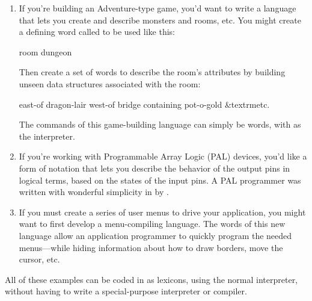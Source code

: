 \begin{enumerate}
\item If you're building an Adventure-type game, you'd want to write a
language that lets you create and describe monsters and rooms, etc. You
might create a defining word called  to be used like this:

\begin{Code}
room dungeon
\end{Code}
Then create a set of words to describe the room's attributes by building
unseen data structures associated with the room:

\begin{Code}[commandchars=\&\{\}]
east-of dragon-lair
west-of bridge
containing pot-o-gold
&textrm{etc.}
\end{Code}
The commands of this game-building language can simply be \Forth{}
words, with \Forth{} as the interpreter.

\item If you're working with Programmable Array Logic (PAL) devices,
you'd like a form of notation that lets you describe the behavior of
the output pins in logical terms, based on the states of the input
pins. A PAL programmer was written with wonderful simplicity in
\Forth{} by  \cite{stolowitz82}.

\item If you must create a series of user menus to drive your application,
you might want to first develop a menu-compiling language. The words of
this new language allow an application programmer to quickly program the
needed menus---while hiding information about how to draw borders, move
the cursor, etc.
\end{enumerate}
All of these examples can be coded in \Forth{} as lexicons, using the
normal \Forth{} interpreter, without having to write a special-purpose
interpreter or compiler.

